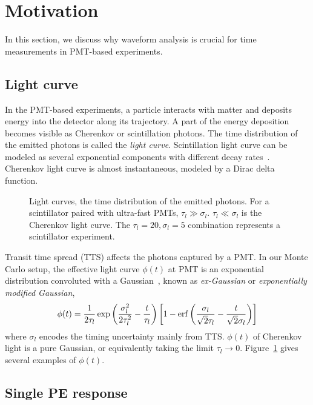 \section{Motivation}
\label{sec:toyMC}

In this section, we discuss why waveform analysis is crucial for time measurements in PMT-based experiments. 

\subsection{Light curve}
In the PMT-based experiments, a particle interacts with matter and deposits energy into the detector along its trajectory. A part of the energy deposition becomes visible as Cherenkov or scintillation photons. The time distribution of the emitted photons is called the \textit{light curve}. Scintillation light curve can be modeled as several exponential components with different decay rates~\cite{rebber_particle_2021}. Cherenkov light curve is almost instantaneous, modeled by a Dirac delta function. 

\begin{figure}[!htb]
  \centering
  \resizebox{0.5\textwidth}{!}{}
  \caption{\label{fig:time-pro} Light curves, the time distribution of the emitted photons. For a scintillator paired with ultra-fast PMTs, $\tau_l \gg \sigma_l$. $\tau_l \ll \sigma_l$ is the Cherenkov light curve. The $\tau_l=20, \sigma_l=5$ combination represents a scintillator experiment. }
\end{figure}

Transit time spread (TTS) affects the photons captured by a PMT. In our Monte Carlo setup, the effective light curve $\phi(t)$ at PMT is an exponential distribution convoluted with a Gaussian~\cite{li_separation_2016}, known as \textit{ex-Gaussian} or \textit{exponentially modified Gaussian}, 
\begin{align}
    \phi(t) = \frac{1}{2\tau_l} \exp\left(\frac{\sigma_l^2}{2\tau_l^2}-\frac{t}{\tau_l}\right) \left[1 - \operatorname{erf}\left( \frac{\sigma_l}{\sqrt{2}\tau_l} - \frac{t}{\sqrt{2}\sigma_l} \right)\right]
    \label{eq:time-pro}
\end{align}
where $\sigma_l$ encodes the timing uncertainty mainly from TTS. $\phi(t)$ of Cherenkov light is a pure Gaussian, or equivalently taking the limit $\tau_l \rightarrow 0$. Figure~\ref{fig:time-pro} gives several examples of $\phi(t)$. 

\subsection{Single PE response}
\label{subsec:spe}

